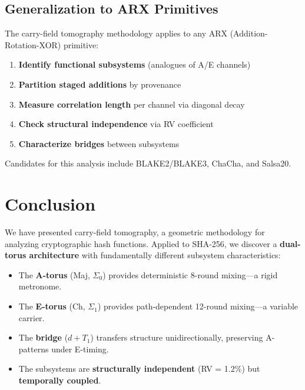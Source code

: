 \documentclass[11pt,a4paper]{article}
\theoremstyle{plain}
\theoremstyle{definition}
\theoremstyle{remark}
\begin{document}
\subsection{Generalization to ARX Primitives}

The carry-field tomography methodology applies to any ARX (Addition-Rotation-XOR) primitive:

\begin{enumerate}
    \item \textbf{Identify functional subsystems} (analogues of A/E channels)
    \item \textbf{Partition staged additions} by provenance
    \item \textbf{Measure correlation length} per channel via diagonal decay
    \item \textbf{Check structural independence} via RV coefficient
    \item \textbf{Characterize bridges} between subsystems
\end{enumerate}

Candidates for this analysis include BLAKE2/BLAKE3, ChaCha, and Salsa20.

\section{Conclusion}

We have presented carry-field tomography, a geometric methodology for analyzing cryptographic hash functions. Applied to SHA-256, we discover a \textbf{dual-torus architecture} with fundamentally different subsystem characteristics:

\begin{itemize}
    \item The \textbf{A-torus} (Maj, $\Sigma_0$) provides deterministic 8-round mixing---a rigid metronome.
    \item The \textbf{E-torus} (Ch, $\Sigma_1$) provides path-dependent 12-round mixing---a variable carrier.
    \item The \textbf{bridge} ($d + T_1$) transfers structure unidirectionally, preserving A-patterns under E-timing.
    \item The subsystems are \textbf{structurally independent} (RV = 1.2\%) but \textbf{temporally coupled}.
\end{itemize}
\end{document}
